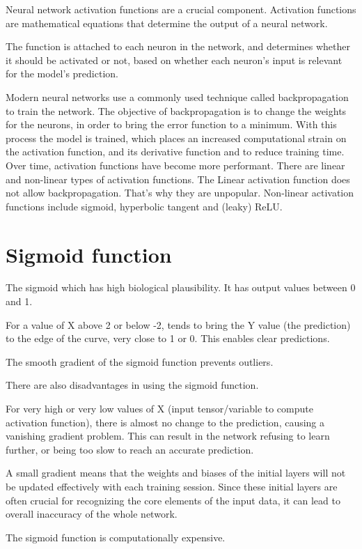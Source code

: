 \documentclass[a4paper,13pt,twoside]{book}
\begin{document}
Neural network activation functions are a crucial component.
Activation functions are mathematical equations that determine the output of a neural network.

The function is attached to each neuron in the network, and determines whether it should be activated or not, based on whether each neuron’s input is relevant for the model’s prediction.

Modern neural networks use a commonly used technique called backpropagation to train the network. The objective of backpropagation is to change the weights for the neurons, in order to bring the error function to a minimum. With this process the model is trained, which places an increased computational strain on the activation function, and its derivative function and to reduce training time. Over time, activation functions have become more performant. There are linear and non-linear types of activation functions. The Linear activation function does not allow backpropagation. That's why they are unpopular. Non-linear activation functions include sigmoid, hyperbolic tangent and (leaky) ReLU.

\section{Sigmoid function}

The sigmoid which has high biological plausibility. It has output values between 0 and 1.

For a value of X above 2 or below -2, tends to bring the Y value (the prediction) to the edge of the curve, very close to 1 or 0. This enables clear predictions.

The smooth gradient of the sigmoid function prevents outliers.

There are also disadvantages in using the sigmoid function.

For very high or very low values of X (input tensor/variable to compute activation function), there is almost no change to the prediction, causing a vanishing gradient problem. This can result in the network refusing to learn further, or being too slow to reach an accurate prediction.

A small gradient means that the weights and biases of the initial layers will not be updated effectively with each training session. Since these initial layers are often crucial for recognizing the core elements of the input data, it can lead to overall inaccuracy of the whole network.

The sigmoid function is computationally expensive.
\end{document}
